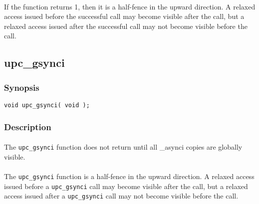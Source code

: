 \documentclass[10pt]{article}
\begin{document}
\paragraph{} If the \function{} function returns 1, then it is a half-fence in the
upward direction.  A relaxed access issued before the successful \function{} call
may become visible after the call, but a relaxed access issued after the
successful \function{} call may not become visible before the call.

\subsection{upc\_gsynci}
\def\function{{\tt upc\_gsynci}}

\subsubsection{Synopsis}

\begin{verbatim}
void upc_gsynci( void );
\end{verbatim}

\subsubsection{Description}

\paragraph{} The \function{} function does not return until all \_asynci copies
are globally visible.

\paragraph{} The \function{} function is a half-fence in the upward direction.  A
relaxed access issued before a \function{} call may become visible after the call,
but a relaxed access issued after a \function{} call may not become visible before
the call.
\end{document}
